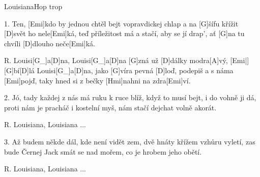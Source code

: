 \begin{song}{Louisiana}{Hop trop}

\begin{xverse}{1. }
Ten, [Emi]kdo by jednou chtěl bejt vopravdickej chlap
a na [G]{šífu} křížit [D]svět ho nele[Emi]ká,
teď příležitost má a stačí, aby se jí drap',
ať [G]na tu chvíli [D]dlouho neče[Emi]ká.
\end{xverse}


\begin{xverse}{R. }
Louisi[G_]{a}[D]{na}, Louisi[G_]a[D]na [G]zná už [D]dálky modra[A]vý, [Emi|]{}
[G]bí[D]lá Louisi[G_]a[D]na, jako [G]víra pevná [D]loď,
podepiš a s náma [Emi]pojď, taky hned si z bečky [Hmi]nahni na zdra[Emi]ví.
\end{xverse}


\begin{xverse}{2. }
Jó, tady každej z nás má ruku k ruce blíž,
když to musí bejt, i do vohně ji dá,
proti nám je pracháč i kostelní myš,
nám stačí dejchat volně akorát.
\end{xverse}


\begin{xverse}{R. }
Louisiana, Louisiana ...
\end{xverse}


\begin{xverse}{3. }
Až budem někde dál, kde není vidět zem,
dvě hnáty křížem vzhůru vyletí,
zas bude Černej Jack smát se nad mořem,
co je hrobem jeho obětí.
\end{xverse}

\begin{xverse}{R. }
Louisiana, Louisiana ...
\end{xverse}

\end{song}

